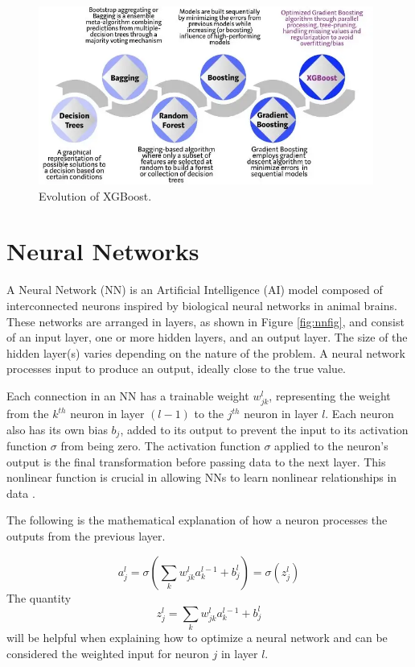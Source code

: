 \begin{figure}[H]
    \centering
    \includegraphics[width=0.98\textwidth]{Other figures/evolution_of_xgb.png}
    \caption{Evolution of XGBoost.
\cite{morde_vishal_nodate}}
    \label{fig:evolution_of_xgb}
\end{figure}

\section{Neural Networks}
A Neural Network (NN) is an Artificial Intelligence (AI) model composed of interconnected neurons inspired by biological neural networks in animal brains.
These networks are arranged in layers, as shown in Figure \ref{fig:nnfig}, and consist of an input layer, one or more hidden layers, and an output layer.
The size of the hidden layer(s) varies depending on the nature of the problem.
A neural network processes input to produce an output, ideally close to the true value.

Each connection in an NN has a trainable weight $w_{jk}^l$, representing the weight from the $k^{th}$ neuron in layer $(l-1)$ to the $j^{th}$ neuron in layer $l$.
Each neuron also has its own bias $b_j$, added to its output to prevent the input to its activation function $\sigma$ from being zero.
The activation function $\sigma$ applied to the neuron's output is the final transformation before passing data to the next layer.
This nonlinear function is crucial in allowing NNs to learn nonlinear relationships in data \cite{universal_approximation}.

The following is the mathematical explanation of how a neuron processes the outputs from the previous layer.

\begin{equation} \label{eq:act_neuron}
    a_{j}^l = \sigma\left(\sum_k w_{jk}^l a^{l-1}_k+b_j^l \right) = \sigma(z_j^l)
\end{equation}
The quantity 
\begin{equation}\label{eq:z_neuron}
    z_j^l = \sum_{k} w_{jk}^l a^{l-1}_k+b_j^l
\end{equation}
will be helpful when explaining how to optimize a neural network and can be considered the weighted input for neuron $j$ in layer $l$.


